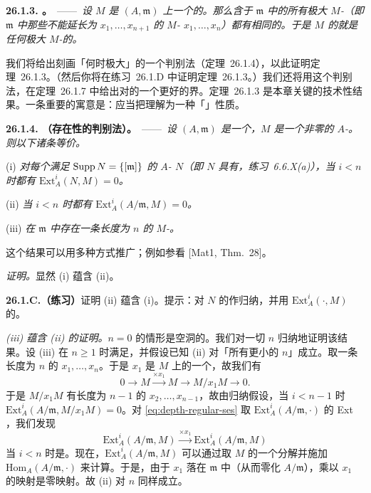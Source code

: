 \textbf{26.1.3. \trhTheorem。}\ ——\ \emph{设 $M$ 是\trNoetherian\trLocalRing{} $(A,\mathfrak{m})$ 上一个\trFinitelyGenerated{}的\trModule。那么含于 $\mathfrak{m}$ 中的所有极大 $M$-\trRegularSequence（即 $\mathfrak{m}$ 中那些不能延长为 $x_1,\dots,x_{n+1}$ 的 $M$-\trRegularSequence{} $x_1,\dots,x_n$）都有相同的\trLength。于是 $M$ 的\trDepth{}就是任何极大 $M$-\trRegularSequence{}的\trLength。}

我们将给出刻画「\trRegularSequence{}何时极大」的一个\trCohomology{}判别法（\mbox{定理~26.1.4}），以此证明\mbox{定理~26.1.3}。（然后你将在\mbox{练习~26.1.D} 中证明\mbox{定理~26.1.3}。）我们还将用这个判别法，在\mbox{定理~26.1.7} 中给出对\trDepth{}的一个更好的界。\mbox{定理~26.1.3} 是本章关键的技术性结果。一条重要的寓意是：应当把\trDepth{}理解为一种「\trCohomology{}」性质。

\textbf{26.1.4. \trhTheorem{}（\trRegularSequence{}存在性的\trCohomology{}判别法）。}\ ——\ \emph{设 $(A,\mathfrak{m})$ 是一个\trNoetherian\trLocalRing，$M$ 是一个非零\trFinitelyGenerated{}的 $A$-\trModule。则以下诸条等价。}

(i) \emph{对每个满足 $\operatorname{Supp} N=\{[\mathfrak{m}]\}$ 的\trFinitelyGenerated{} $A$-\trModule{} $N$（即 $N$ 具有\trFiniteLength，\mbox{练习~6.6.X}(a)），当 $i<n$ 时都有 $\mathrm{Ext}^i_A(N,M)=0$。}

(ii) \emph{当 $i<n$ 时都有 $\mathrm{Ext}^i_A(A/\mathfrak{m},M)=0$。}

(iii) \emph{在 $\mathfrak{m}$ 中存在一条长度为 $n$ 的 $M$-\trRegularSequence。}

这个结果可以用多种方式推广；例如参看 [Mat1, Thm.~28]。

\emph{证明。}\quad 显然 (i) 蕴含 (ii)。

\textbf{26.1.C.（练习）}\quad 证明 (ii) 蕴含 (i)。提示：对 $N$ 的\trLength{}作归纳，并用 $\mathrm{Ext}^i_A(\cdot,M)$ 的\trLongExactSequence。

\emph{(iii) 蕴含 (ii) 的证明。}\quad $n=0$ 的情形是空洞的。我们对一切 $n$ 归纳地证明该结果。设 (iii) 在 $n\ge 1$ 时满足，并假设已知 (ii) 对「所有更小的 $n$」成立。取一条长度为 $n$ 的\trRegularSequence{} $x_1,\dots,x_n$。于是 $x_1$ 是 $M$ 上的一个\trNonZerodivisor，故我们有\trExactSequence{}
\[
\tag{26.1.4.1}\label{eq:depth-regular-ses}
0 \longrightarrow M \overset{\times x_1}{\longrightarrow} M \longrightarrow M/x_1 M \longrightarrow 0.
\]
于是 $M/x_1 M$ 有长度为 $n-1$ 的\trRegularSequence{} $x_2,\dots,x_{n-1}$，故由归纳假设，当 $i<n-1$ 时 $\mathrm{Ext}^i_A(A/\mathfrak{m},M/x_1 M)=0$。对 \eqref{eq:depth-regular-ses} 取 $\mathrm{Ext}^i_A(A/\mathfrak{m},\cdot)$ 的 Ext \trLongExactSequence，我们发现
\[
\mathrm{Ext}^i_A(A/\mathfrak{m},M) \overset{\times x_1}{\longrightarrow} \mathrm{Ext}^i_A(A/\mathfrak{m},M)
\]
当 $i<n$ 时是\trInjectiveMap。现在，$\mathrm{Ext}^i_A(A/\mathfrak{m},M)$ 可以通过取 $M$ 的一个\trInjective{}分解并施加 $\mathrm{Hom}_A(A/\mathfrak{m},\cdot)$ 来计算。于是，由于 $x_1$ 落在 $\mathfrak{m}$ 中（从而零化 $A/\mathfrak{m}$），乘以 $x_1$ 的映射是零映射。故 (ii) 对 $n$ 同样成立。

